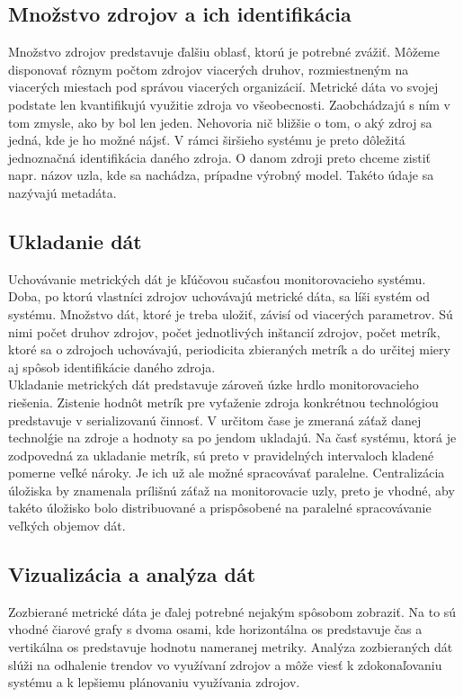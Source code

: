 \documentclass[printed,11pt,twoside,color,cover,table]{fithesis3}
\begin{document}
\subsection{Množstvo zdrojov a ich identifikácia}
Množstvo zdrojov predstavuje ďalšiu oblasť, ktorú je potrebné zvážiť. Môžeme disponovať rôznym počtom zdrojov viacerých druhov, rozmiestneným na viacerých miestach pod správou viacerých organizácií.
Metrické dáta vo svojej
podstate len kvantifikujú využitie zdroja vo všeobecnosti. Zaobchádzajú s ním v tom zmysle, ako by bol len jeden. Nehovoria nič bližšie o tom, o aký zdroj sa jedná, kde je ho možné nájsť. V rámci širšieho
systému je preto dôležitá jednoznačná identifikácia daného zdroja. O danom zdroji preto chceme zistiť napr. názov uzla, kde sa nachádza, prípadne výrobný model. Takéto údaje sa nazývajú metadáta.

\subsection{Ukladanie dát}
Uchovávanie metrických dát je kľúčovou sučasťou monitorovacieho systému. Doba, po ktorú vlastníci zdrojov uchovávajú metrické dáta, sa líši systém od systému. 
Množstvo dát, ktoré je treba uložiť, závisí od viacerých parametrov. Sú nimi počet druhov zdrojov, počet jednotlivých inštancií zdrojov, počet metrík, ktoré sa o zdrojoch
uchovávajú, periodicita zbieraných metrík a do určitej miery aj spôsob identifikácie daného zdroja.
\\Ukladanie metrických dát predstavuje zároveň úzke hrdlo monitorovacieho riešenia. Zistenie hodnôt metrík pre vyťaženie zdroja konkrétnou technológiou predstavuje v serializovanú činnosť. V určitom čase je
zmeraná záťaž danej technolǵie na zdroje a hodnoty sa po jendom ukladajú. Na časť systému, ktorá je zodpovedná za ukladanie metrík, sú preto v pravidelných intervaloch kladené pomerne 
veľké nároky. Je ich už ale možné spracovávať paralelne. Centralizácia úložiska by znamenala prílišnú záťaž na monitorovacie uzly, preto je vhodné, aby takéto úložisko bolo distribuované a prispôsobené 
na paralelné spracovávanie veľkých objemov dát.

\subsection{Vizualizácia a analýza dát}
Zozbierané metrické dáta je ďalej potrebné nejakým spôsobom zobraziť. Na to sú vhodné čiarové grafy s dvoma osami, kde horizontálna os predstavuje čas a vertikálna os predstavuje hodnotu nameranej metriky.
Analýza zozbieraných dát slúži na odhalenie trendov vo využívaní zdrojov a môže viesť k zdokonaľovaniu systému a k lepšiemu plánovaniu využívania zdrojov.
\end{document}
